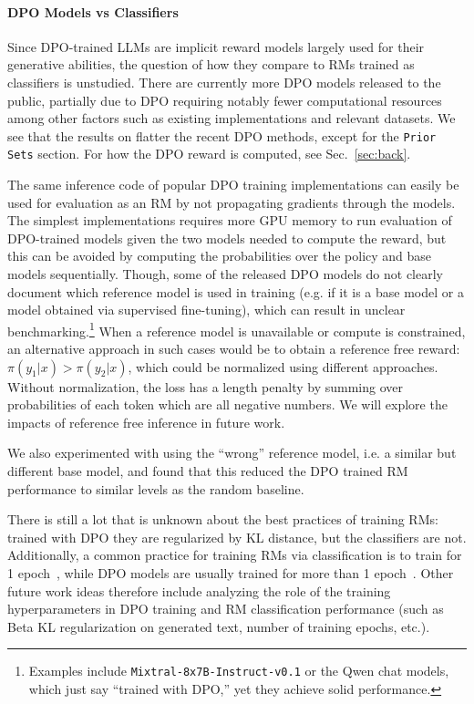 \paragraph{DPO Models vs Classifiers}
Since DPO-trained LLMs are implicit reward models largely used for their generative abilities, the question of how they compare to RMs trained as classifiers is unstudied.
There are currently more DPO models released to the public, partially due to DPO requiring notably fewer computational resources among other factors such as existing implementations and relevant datasets. 
We see that the results on \name{} flatter the recent DPO methods, except for the \texttt{Prior Sets} section. 
For how the DPO reward is computed, see Sec.~\ref{sec:back}. 

The same inference code of popular DPO training implementations can easily be used for evaluation as an RM by not propagating gradients through the models. 
The simplest implementations requires more GPU memory to run evaluation of DPO-trained models given the two models needed to compute the reward, but this can be avoided by computing the probabilities over the policy and base models sequentially.
Though, some of the released DPO models do not clearly document which reference model is used in training (e.g. if it is a base model or a model obtained via supervised fine-tuning), which can result in unclear benchmarking.\footnote{Examples include \texttt{Mixtral-8x7B-Instruct-v0.1} or the Qwen chat models, which just say ``trained with DPO,'' yet they achieve solid performance.} 
When a reference model is unavailable or compute is constrained, an alternative approach in such cases would be to obtain a reference free reward: $\pi(y_1|x) > \pi(y_2|x)$, which could be normalized using different approaches.
Without normalization, the loss has a length penalty by summing over probabilities of each token which are all negative numbers.
We will explore the impacts of reference free inference in future work.

We also experimented%
 with using the ``wrong'' reference model, i.e. a similar but different base model, and found that this reduced the DPO trained RM performance to similar levels as the random baseline.



There is still a lot that is unknown about the best practices of training RMs: trained with DPO they are regularized by KL distance, but the classifiers are not. 
Additionally, a common practice for training RMs via classification is to train for 1 epoch~\citep{ouyang2022training}, while DPO models are usually trained for more than 1 epoch~\citep{tunstall2023zephyr,ivison2023camels}. 
Other future work ideas therefore include analyzing the role of the training hyperparameters in DPO training and RM classification performance (such as Beta KL regularization on generated text, number of training epochs, etc.). 

